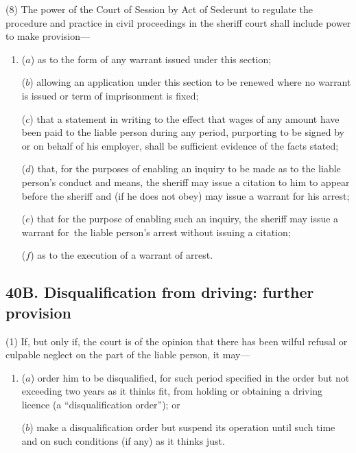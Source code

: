 \documentclass[12pt,a4paper]{article}
\begin{document}
(8) The power of the Court of Session by Act of Sederunt to regulate the procedure and practice in civil proceedings in the sheriff court shall include power to make provision—
\begin{enumerate}\item[]
($a$) as to the form of any warrant issued under this section;

($b$) allowing an application under this section to be renewed where no warrant is issued or term of imprisonment is fixed;

($c$) that a statement in writing to the effect that wages of any amount have been paid to the liable person during any period, purporting to be signed by or on behalf of his employer, shall be sufficient evidence of the facts stated;

($d$) that, for the purposes of enabling an inquiry to be made as to the liable person’s conduct and means, the sheriff may issue a citation to him to appear before the sheriff and (if he does not obey) may issue a warrant for his arrest;

($e$) that for the purpose of enabling such an inquiry, the sheriff may issue a warrant for~the liable person’s arrest without issuing a citation;

($f$) as to the execution of a warrant of arrest.
\end{enumerate}


\subsection{40B. Disqualification from driving: further provision}
 
(1) If, but only if, the court is of the opinion that there has been wilful refusal or culpable neglect on the part of the liable person, it may—
\begin{enumerate}\item[]
($a$) order him to be disqualified, for such period specified in the order but not exceeding two years as it thinks fit, from holding or obtaining a driving licence (a “disqualification order”); or

($b$) make a disqualification order but suspend its operation until such time and on such conditions (if any) as it thinks just.
\end{enumerate}
\end{document}
